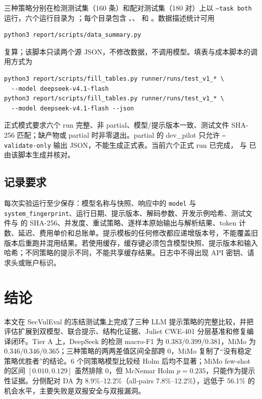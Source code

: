 \documentclass[conference]{IEEEtran}
\begin{document}
三种策略分别在检测测试集（160 条）和配对测试集（180 对）上以 \texttt{--task both} 运行，六个运行目录为 ；每个目录包含 、、 和 。数据描述统计可用
\begin{lstlisting}
python3 report/scripts/data_summary.py
\end{lstlisting}
复算；该脚本只读两个源 JSON，不修改数据，不调用模型。填表与成本脚本的调用方式为
\begin{lstlisting}
python3 report/scripts/fill_tables.py runner/runs/test_v1_* \
  --model deepseek-v4.1-flash
python3 report/scripts/fill_tables.py runner/runs/test_v1_* \
  --model deepseek-v4.1-flash --json
\end{lstlisting}
正式模式要求六个 run 完整、非 partial、模型/提示版本一致、测试文件 SHA-256 匹配；缺产物或 partial 时非零退出。partial 的 dev\_pilot 只允许 \texttt{--validate-only} 输出 JSON，不能生成正式表。当前六个正式 run 已完成， 与  已由该脚本生成并核对。

\subsection{记录要求}
每次实验运行至少保存：模型名称与快照、响应中的 \texttt{model} 与 \texttt{system\_fingerprint}、运行日期、提示版本、解码参数、开发示例哈希、测试文件与  的 SHA-256、并发度、重试策略、逐样本原始输出与解析结果、token 计数、延迟、费用单价和总账单。提示模板的任何修改都应递增版本号，不能覆盖旧版本后重跑并混用结果。若使用缓存，缓存键必须包含模型快照、提示版本和输入哈希；不同策略的提示不同，不能共享缓存结果。日志中不得出现 API 密钥、请求头或账户标识。

\section{结论}
\label{sec:conclusion}
本文在 SecVulEval 的冻结测试集上完成了三种 LLM 提示策略的完整比较，并把评估扩展到双模型、联合提示、结构化证据、Juliet CWE-401 分层基准和修复编译闭环。Tier A 上，DeepSeek 的检测 macro-F1 为 0.383/0.399/0.381，MiMo 为 0.346/0.346/0.365；三种策略的两两差值区间全部跨 0，MiMo 复制了“没有稳定策略优胜者”的结论。6 个同策略模型比较经 Holm 后均不显著；MiMo few-shot 的区间 $[0.010,0.129]$ 虽然排除 0，但 McNemar Holm $p=0.235$，只能作为提示性证据。分侧配对 DA 为 8.9\%--12.2\%（all-pairs 7.8\%--12.2\%），远低于 56.1\% 的机会水平，主要失败是双报安全与双报漏洞。
\end{document}

